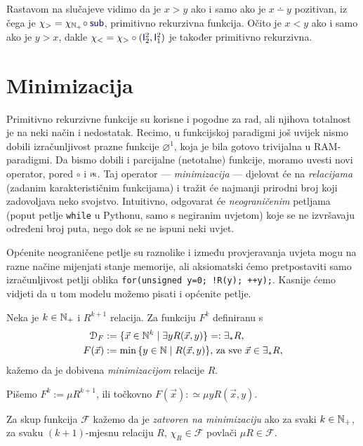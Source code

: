 \begin{primjer}[{name=[primitivna rekurzivnost relacija strogog uređaja]}]\label{pr:m-v}
Rastavom na slučajeve vidimo da je $x>y$ ako i samo ako je $x\dotminus y$ pozitivan, iz čega je $\chi_>=\chi_{\N_+}\!\circ\f{sub}$, pri\-mi\-tiv\-no rekurzivna funkcija. Očito je $x<y$ ako i samo ako je $y>x$, dakle $\chi_<=\chi_>\circ(\f I_2^2,\f I_1^2)$ je također primitivno rekurzivna.
\end{primjer}

\section{Minimizacija}

Primitivno rekurzivne funkcije su korisne i pogodne za rad, ali njihova totalnost je na neki način i nedostatak. Recimo, u funkcijskoj paradigmi još uvijek nismo dobili izračunljivost prazne funkcije $\varnothing^1$, koja je bila gotovo trivijalna u RAM-paradigmi. Da bismo dobili i parcijalne (netotalne) funkcije, moramo uvesti novi operator, pored $\circ$ i $\pr$. Taj operator --- \emph{minimizacija} --- djelovat će na \emph{relacijama} (zadanim karakterističnim funkcijama) i tražit će najmanji prirodni broj koji zadovoljava neko svojstvo. Intuitivno, odgovarat će \emph{neograničenim} petljama (poput petlje \texttt{while} u Pythonu, samo s negiranim uvjetom) koje se ne izvršavaju određeni broj puta, nego dok se ne ispuni neki uvjet.

Općenite neograničene petlje su raznolike i između provjeravanja uvjeta mogu na razne načine mijenjati stanje memorije, ali aksiomatski ćemo pretpostaviti samo izračunljivost petlji oblika \texttt{for(unsigned y=0; !R(y); ++y);}. Kasnije ćemo vidjeti da u tom modelu možemo pisati i općenite petlje.

\begin{definicija}[{name=[minimizacija]}]
Neka je $k\in{\mathbb N}_+$ i $R^{k+1}$ relacija. Za funkciju $F^k$ definiranu s
\begin{align}
    \label{eq:dommu}\mathcal D_{F}&:=\{\vec x\in{\mathbb N}^k\mid\exists yR(\vec x,y)\}=:\exists_*R\text,\\
    F(\vec x)&:=\min\,\{y\in{\mathbb N}\mid R(\vec x,y)\}\text{, za sve $\vec x\in\exists_* R$,}
\end{align}
kažemo da je dobivena \emph{minimizacijom} relacije $R$.

	Pišemo $F^k:=\mu R^{k+1}$, ili točkovno
$F(\vec x):\simeq\mu yR(\vec x,y)$.

    Za skup funkcija $\mathcal F$ kažemo da je \emph{zatvoren na minimizaciju} ako za svaki $k\in{\mathbb N}_+$, za svaku $(k+1)$-mjesnu relaciju $R$, $\chi_R\in\mathcal F$ povlači $\mu R\in\mathcal F$. 
\end{definicija}

